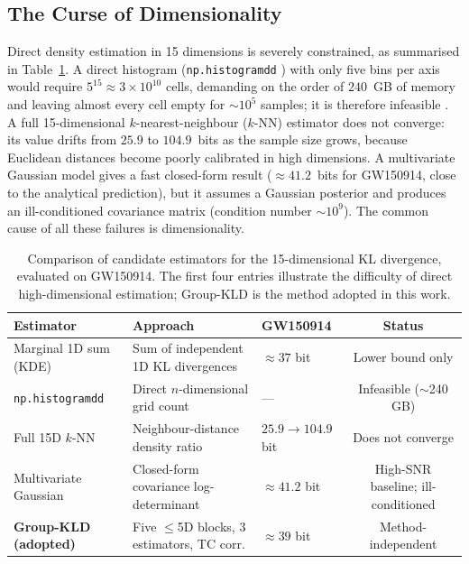 \documentclass{phys400finalreport}
\begin{document}
\subsection*{The Curse of Dimensionality}

Direct density estimation in 15 dimensions is severely constrained, as
summarised in Table~\ref{tab:methods}. A direct histogram
(\texttt{np.histogramdd} \citep{numpy_paper}) with only five bins per axis
would require $5^{15} \approx 3 \times 10^{10}$ cells, demanding on the order of
$240$~GB of memory and leaving almost every cell empty for $\sim\!10^5$
samples; it is therefore infeasible \citep{altman2018curse}. A full
15-dimensional $k$-nearest-neighbour ($k$-NN) estimator does not converge: its
value drifts from $25.9$ to $104.9$~bits as the sample size grows, because
Euclidean distances become poorly calibrated in high dimensions. A multivariate
Gaussian model \citep{munoz2026kl} gives a fast closed-form result
($\approx\!41.2$~bits for GW150914, close to the analytical prediction), but it
assumes a Gaussian posterior and produces an ill-conditioned covariance matrix
(condition number $\sim\!10^9$). The common cause of all these failures is
dimensionality.

\begin{table}[htbp]
\centering
\small
\caption{Comparison of candidate estimators for the 15-dimensional KL
divergence, evaluated on GW150914. The first four entries illustrate the
difficulty of direct high-dimensional estimation; Group-KLD is the method
adopted in this work.}
\label{tab:methods}
\begin{tabular}{lllc}
\toprule
Estimator & Approach & GW150914 & Status \\
\midrule
Marginal 1D sum (KDE)        & Sum of independent 1D KL divergences        & $\approx 37$ bit       & Lower bound only \\
\texttt{np.histogramdd}      & Direct $n$-dimensional grid count           & ---                    & Infeasible ($\sim$240 GB) \\
Full 15D $k$-NN              & Neighbour-distance density ratio            & $25.9 \rightarrow 104.9$ bit & Does not converge \\
Multivariate Gaussian        & Closed-form covariance log-determinant      & $\approx 41.2$ bit     & High-SNR baseline; ill-conditioned \\
\textbf{Group-KLD (adopted)} & Five $\leq$5D blocks, 3 estimators, TC corr. & $\approx 39$ bit       & Method-independent \\
\bottomrule
\end{tabular}
\end{table}
\end{document}
